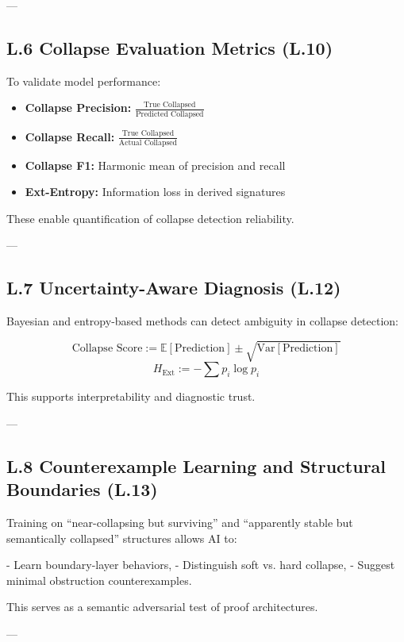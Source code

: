 \documentclass[11pt]{article}
\begin{document}
\begin{axiom}
\begin{axiom}
{---

\subsection*{L.6 Collapse Evaluation Metrics (L.10)}

To validate model performance:

\begin{itemize}
  \item \textbf{Collapse Precision:} $\frac{\text{True Collapsed}}{\text{Predicted Collapsed}}$
  \item \textbf{Collapse Recall:} $\frac{\text{True Collapsed}}{\text{Actual Collapsed}}$
  \item \textbf{Collapse F1:} Harmonic mean of precision and recall
  \item \textbf{Ext-Entropy:} Information loss in derived signatures
\end{itemize}

These enable quantification of collapse detection reliability.

---

\subsection*{L.7 Uncertainty-Aware Diagnosis (L.12)}

Bayesian and entropy-based methods can detect ambiguity in collapse detection:

\[
\text{Collapse Score} := \mathbb{E}[\text{Prediction}] \pm \sqrt{\text{Var}[\text{Prediction}]}
\]
\[
H_{\text{Ext}} := -\sum p_i \log p_i
\]

This supports interpretability and diagnostic trust.

---

\subsection*{L.8 Counterexample Learning and Structural Boundaries (L.13)}

Training on “near-collapsing but surviving” and “apparently stable but semantically collapsed” structures allows AI to:

- Learn boundary-layer behaviors,
- Distinguish soft vs. hard collapse,
- Suggest minimal obstruction counterexamples.

This serves as a semantic adversarial test of proof architectures.

---

}
\end{axiom}
\end{axiom}
\end{document}
